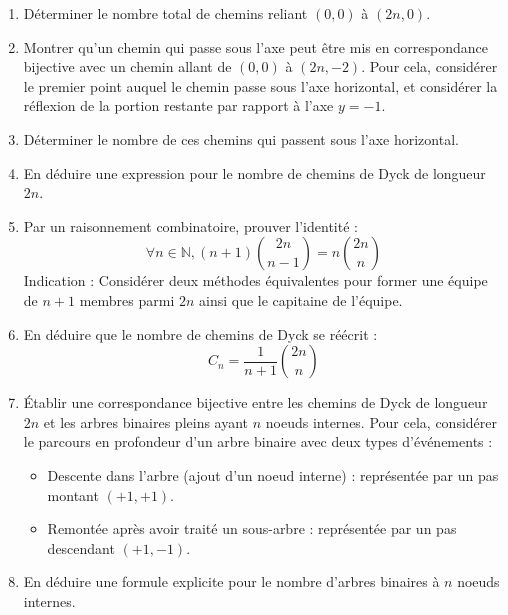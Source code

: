 \documentclass[10pt,a4paper]{article}
\begin{document}
\begin{enumerate}
    \item Déterminer le nombre total de chemins reliant \( (0,0) \) à \( (2n,0) \).
    \item Montrer qu'un chemin qui passe sous l'axe peut être mis en correspondance bijective avec
    un chemin allant de \( (0,0) \) à \( (2n,-2) \). Pour cela, considérer le premier point auquel
    le chemin passe sous l'axe horizontal, et considérer la réflexion de la portion restante par
    rapport à l'axe $y = -1$.
    \item Déterminer le nombre de ces chemins qui passent sous l'axe horizontal.
    \item En déduire une expression pour le nombre de chemins de Dyck de longueur \( 2n \).
    \item Par un raisonnement combinatoire, prouver l'identité :
    $$ \forall n \in \mathbb{N}, (n+1)\binom{2n}{n-1} = n\binom{2n}{n} $$
    Indication : Considérer deux méthodes équivalentes pour former une équipe de \( n + 1 \)
    membres parmi \( 2n \) ainsi que le capitaine de l'équipe.
    \item En déduire que le nombre de chemins de Dyck se réécrit :
    $$C_n = \frac{1}{n+1}\binom{2n}{n}$$
    \item Établir une correspondance bijective entre les chemins de Dyck de longueur \( 2n \) et les
    arbres binaires pleins ayant \( n \) noeuds internes.
    Pour cela, considérer le parcours en profondeur d'un arbre binaire avec deux types d'événements :
    \begin{itemize}
        \item Descente dans l'arbre (ajout d'un noeud interne) : représentée par un pas montant \(
        (+1,+1) \).
        \item Remontée après avoir traité un sous-arbre : représentée par un pas descendant \(
        (+1,-1) \).
    \end{itemize}
    \item En déduire une formule explicite pour le nombre d'arbres binaires à \( n \) noeuds
    internes.
\end{enumerate}
\end{document}
